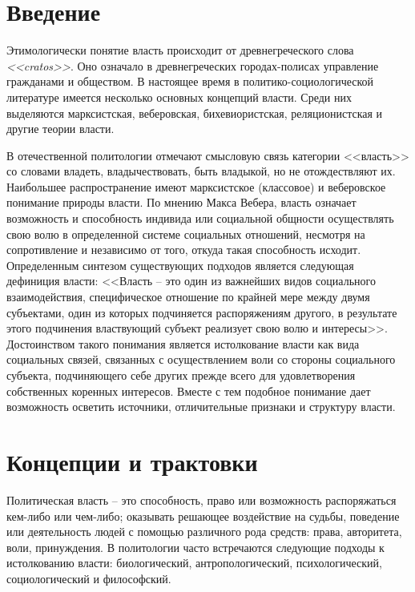 \chapter*{Введение}

Этимологически понятие власть происходит от древнегреческого слова \linebreak
\emph{<<cratos>>}. Оно означало в древнегреческих городах-полисах управление
гражданами и обществом. В настоящее время в политико-социологической литературе
имеется несколько основных концепций власти. Среди них выделяются марксистская,
веберовская, бихевиористская, реляционистская и другие теории власти.

В отечественной политологии отмечают смысловую связь категории <<власть>> со
словами владеть, владычествовать, быть владыкой, но не отождествляют их.
Наибольшее распространение имеют марксистское (классовое) и веберовское
понимание природы власти. По мнению Макса Вебера, власть означает возможность и
способность индивида или социальной общности осуществлять свою волю в
определенной системе социальных отношений, несмотря на сопротивление и
независимо от того, откуда такая способность исходит. Определенным синтезом
существующих подходов является следующая дефиниция власти: <<Власть -- это один
из важнейших видов социального взаимодействия, специфическое отношение по
крайней мере между двумя субъектами, один из которых подчиняется распоряжениям
другого, в результате этого подчинения властвующий субъект реализует свою волю
и интересы>>. Достоинством такого понимания является истолкование
власти как вида социальных связей, связанных с осуществлением воли со
стороны социального субъекта, подчиняющего себе других прежде всего для
удовлетворения собственных коренных интересов. Вместе с тем подобное понимание
дает возможность осветить источники, отличительные признаки и структуру власти.

\pagebreak %

\chapter{Концепции и трактовки}

Политическая власть -- это способность, право или возможность распоряжаться
кем-либо или чем-либо; оказывать решающее воздействие на судьбы, поведение или
деятельность людей с помощью различного рода средств: права, авторитета, воли,
принуждения. В политологии часто встречаются следующие подходы к истолкованию
власти: биологический, антропологический, психологический, социологический и
философский.

